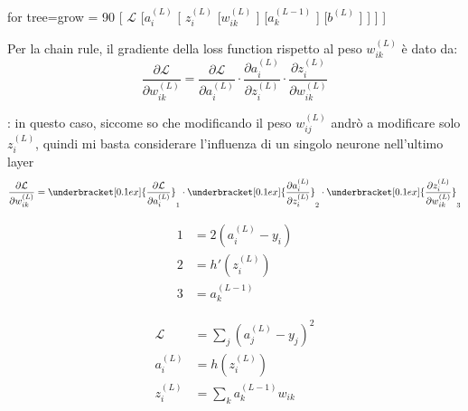 \begin{minipage}[c]{0.48\textwidth}
	\begin{center}
		\begin{forest}
			for tree={grow = 90}
			[
			$ \mathcal{L} $
			[$ a_i^{\left(L\right)} $
			[
			$ z_i^{\left(L\right)} $
			[$ w_{ik}^{\left(L\right)} $ ]
				[$ a_{k}^{\left(L-1\right)} $ ]
				[$ b^{\left(L\right)} $ ]
			]
			]
			]
		\end{forest}
	\end{center}
\end{minipage}
%
\begin{minipage}[c]{0.48\textwidth}
	Per la chain rule, il gradiente della loss function rispetto al peso $ w_{ik}^{\left(L\right)} $ è dato da:
	\[
		\frac{\partial \mathcal{L}}{\partial w_{ik}^{\left(L\right)}} = \frac{\partial \mathcal{L}}{\partial a_i^{\left(L\right)}} \cdot \frac{\partial a_i^{\left(L\right)}}{\partial z_i^{\left(L\right)}} \cdot \frac{\partial z_i^{\left(L\right)}}{\partial w_{ik}^{\left(L\right)}}
	\]
\end{minipage}
\vskip3mm
: in questo caso, siccome so che modificando il peso $ w_{ij}^{\left(L\right)} $ andrò a modificare solo $ z_{i}^{\left(L\right)} $, quindi mi basta considerare l'influenza di un singolo neurone nell'ultimo layer
\[
	\frac{\partial \mathcal{L}}{\partial w_{ik}^{\left(L\right)}} = \underbracket[0.1ex]{\frac{\partial \mathcal{L}}{\partial a_i^{\left(L\right)}}}_{1} \cdot \underbracket[0.1ex]{\frac{\partial a_i^{\left(L\right)}}{\partial z_i^{\left(L\right)}}}_{2} \cdot \underbracket[0.1ex]{\frac{\partial z_i^{\left(L\right)}}{\partial w_{ik}^{\left(L\right)}}}_{3} \\
\]
\vskip0mm
\begin{minipage}[t]{0.48\textwidth}
	\begin{align*}
		1 & = 2\left(a_i^{\left(L\right)} - y_i\right) \\
		2 & = h'\left(z_i^{\left(L\right)}\right)      \\
		3 & = a_k^{\left(L-1\right)}
	\end{align*}
\end{minipage}
%
\begin{minipage}[t]{0.48\textwidth}
	\begin{align*}
		\mathcal{L}          & = \sum_{j} \left(a_j^{\left(L\right)} - y_j\right)^2 \\
		a_i^{\left(L\right)} & = h\left(z_i^{\left(L\right)}\right)                 \\
		z_i^{\left(L\right)} & = \sum_{k} a_k ^{\left(L-1\right)} w_{ik}            \\
	\end{align*}
\end{minipage}

